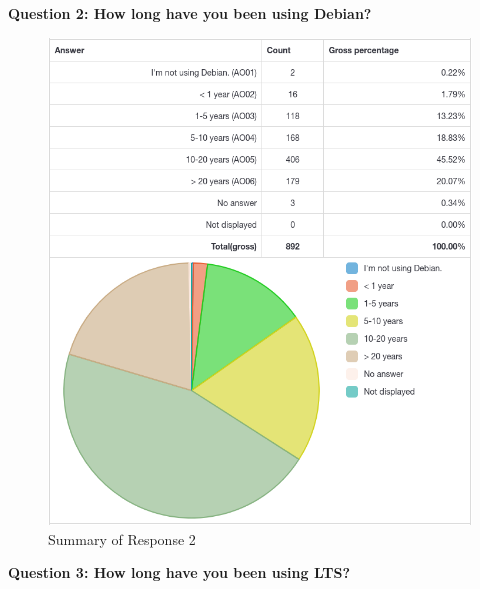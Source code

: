 \documentclass{article}
\begin{document}
\newpage

\Large{\textbf{Question 2: How long have you been using Debian?}}

\vspace{3mm}
\begin{figure}[h!]
\centering
\includegraphics[width=16.5cm]{assets/2-complete-responses.png}
\caption{Summary of Response 2}
\end{figure}

\newpage

\Large{\textbf{Question 3: How long have you been using LTS?}}
\end{document}
